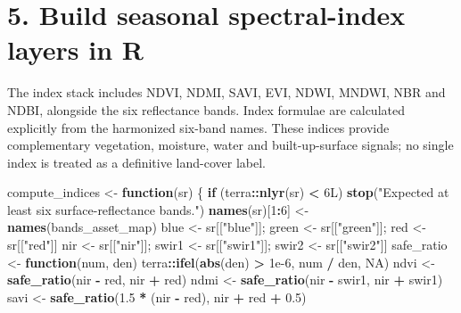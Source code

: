 \documentclass[
]{article}
\newenvironment{Shaded}{\begin{snugshade}}{\end{snugshade}}
\newcommand{\ConstantTok}[1]{\textcolor[rgb]{0.56,0.35,0.01}{#1}}
\newcommand{\ControlFlowTok}[1]{\textcolor[rgb]{0.13,0.29,0.53}{\textbf{#1}}}
\newcommand{\DataTypeTok}[1]{\textcolor[rgb]{0.13,0.29,0.53}{#1}}
\newcommand{\DecValTok}[1]{\textcolor[rgb]{0.00,0.00,0.81}{#1}}
\newcommand{\FloatTok}[1]{\textcolor[rgb]{0.00,0.00,0.81}{#1}}
\newcommand{\FunctionTok}[1]{\textcolor[rgb]{0.13,0.29,0.53}{\textbf{#1}}}
\newcommand{\NormalTok}[1]{#1}
\newcommand{\OtherTok}[1]{\textcolor[rgb]{0.56,0.35,0.01}{#1}}
\newcommand{\SpecialCharTok}[1]{\textcolor[rgb]{0.81,0.36,0.00}{\textbf{#1}}}
\newcommand{\StringTok}[1]{\textcolor[rgb]{0.31,0.60,0.02}{#1}}
\begin{document}
\section{5. Build seasonal spectral-index layers in
R}\label{build-seasonal-spectral-index-layers-in-r}

The index stack includes NDVI, NDMI, SAVI, EVI, NDWI, MNDWI, NBR and
NDBI, alongside the six reflectance bands. Index formulae are calculated
explicitly from the harmonized six-band names. These indices provide
complementary vegetation, moisture, water and built-up-surface signals;
no single index is treated as a definitive land-cover label.

\begin{Shaded}
\begin{Highlighting}[]
\NormalTok{compute\_indices }\OtherTok{\textless{}{-}} \ControlFlowTok{function}\NormalTok{(sr) \{}
  \ControlFlowTok{if}\NormalTok{ (terra}\SpecialCharTok{::}\FunctionTok{nlyr}\NormalTok{(sr) }\SpecialCharTok{\textless{}} \DecValTok{6}\DataTypeTok{L}\NormalTok{) }\FunctionTok{stop}\NormalTok{(}\StringTok{"Expected at least six surface{-}reflectance bands."}\NormalTok{)}
  \FunctionTok{names}\NormalTok{(sr)[}\DecValTok{1}\SpecialCharTok{:}\DecValTok{6}\NormalTok{] }\OtherTok{\textless{}{-}} \FunctionTok{names}\NormalTok{(bands\_asset\_map)}
\NormalTok{  blue }\OtherTok{\textless{}{-}}\NormalTok{ sr[[}\StringTok{"blue"}\NormalTok{]]; green }\OtherTok{\textless{}{-}}\NormalTok{ sr[[}\StringTok{"green"}\NormalTok{]]; red }\OtherTok{\textless{}{-}}\NormalTok{ sr[[}\StringTok{"red"}\NormalTok{]]}
\NormalTok{  nir }\OtherTok{\textless{}{-}}\NormalTok{ sr[[}\StringTok{"nir"}\NormalTok{]]; swir1 }\OtherTok{\textless{}{-}}\NormalTok{ sr[[}\StringTok{"swir1"}\NormalTok{]]; swir2 }\OtherTok{\textless{}{-}}\NormalTok{ sr[[}\StringTok{"swir2"}\NormalTok{]]}
\NormalTok{  safe\_ratio }\OtherTok{\textless{}{-}} \ControlFlowTok{function}\NormalTok{(num, den) terra}\SpecialCharTok{::}\FunctionTok{ifel}\NormalTok{(}\FunctionTok{abs}\NormalTok{(den) }\SpecialCharTok{\textgreater{}} \FloatTok{1e{-}6}\NormalTok{, num }\SpecialCharTok{/}\NormalTok{ den, }\ConstantTok{NA}\NormalTok{)}
\NormalTok{  ndvi }\OtherTok{\textless{}{-}} \FunctionTok{safe\_ratio}\NormalTok{(nir }\SpecialCharTok{{-}}\NormalTok{ red, nir }\SpecialCharTok{+}\NormalTok{ red)}
\NormalTok{  ndmi }\OtherTok{\textless{}{-}} \FunctionTok{safe\_ratio}\NormalTok{(nir }\SpecialCharTok{{-}}\NormalTok{ swir1, nir }\SpecialCharTok{+}\NormalTok{ swir1)}
\NormalTok{  savi }\OtherTok{\textless{}{-}} \FunctionTok{safe\_ratio}\NormalTok{(}\FloatTok{1.5} \SpecialCharTok{*}\NormalTok{ (nir }\SpecialCharTok{{-}}\NormalTok{ red), nir }\SpecialCharTok{+}\NormalTok{ red }\SpecialCharTok{+} \FloatTok{0.5}\NormalTok{)}

\end{Highlighting}
\end{Shaded}
\end{document}
